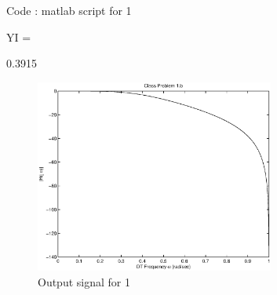 




\begin{homeworkProblem}

\begin{center}
{Code : matlab script for 1}
\end{center}

YI =

    0.3915


\begin{figure}[!h]
  \centering
    \includegraphics[width=0.7\textwidth]{matlab_script/class19_11_13.eps}
  \caption{Output signal for 1}
\end{figure}
\pagebreak

\end{homeworkProblem}
